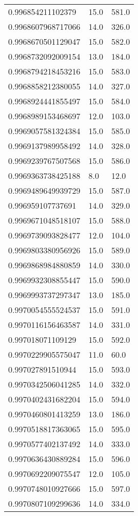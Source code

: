 \begin{center}
\begin{supertabular}[H]{p{0.30\textwidth}p{0.05\textwidth}p{0.05\textwidth}}
0.996854211102379 & 15.0 & 581.0 \\ 
0.9968607968717066 & 14.0 & 326.0 \\ 
0.9968670501129047 & 15.0 & 582.0 \\ 
0.9968732092009154 & 13.0 & 184.0 \\ 
0.9968794218453216 & 15.0 & 583.0 \\ 
0.9968858212380055 & 14.0 & 327.0 \\ 
0.9968924441855497 & 15.0 & 584.0 \\ 
0.9968989153468697 & 12.0 & 103.0 \\ 
0.9969057581324384 & 15.0 & 585.0 \\ 
0.9969137989958492 & 14.0 & 328.0 \\ 
0.9969239767507568 & 15.0 & 586.0 \\ 
0.9969363738425188 & 8.0 & 12.0 \\ 
0.9969489649939729 & 15.0 & 587.0 \\ 
0.996959107737691 & 14.0 & 329.0 \\ 
0.9969671048518107 & 15.0 & 588.0 \\ 
0.9969739093828477 & 12.0 & 104.0 \\ 
0.9969803380956926 & 15.0 & 589.0 \\ 
0.9969868984880859 & 14.0 & 330.0 \\ 
0.9969932308855447 & 15.0 & 590.0 \\ 
0.9969993737297347 & 13.0 & 185.0 \\ 
0.9970054555524537 & 15.0 & 591.0 \\ 
0.9970116156463587 & 14.0 & 331.0 \\ 
0.997018071109129 & 15.0 & 592.0 \\ 
0.9970229905575047 & 11.0 & 60.0 \\ 
0.997027891510944 & 15.0 & 593.0 \\ 
0.9970342506041285 & 14.0 & 332.0 \\ 
0.9970402431682204 & 15.0 & 594.0 \\ 
0.9970460801413259 & 13.0 & 186.0 \\ 
0.9970518817363065 & 15.0 & 595.0 \\ 
0.9970577402137492 & 14.0 & 333.0 \\ 
0.9970636430889284 & 15.0 & 596.0 \\ 
0.9970692209075547 & 12.0 & 105.0 \\ 
0.9970748010927666 & 15.0 & 597.0 \\ 
0.9970807109299636 & 14.0 & 334.0 \\ 

\end{supertabular}
\end{center}
